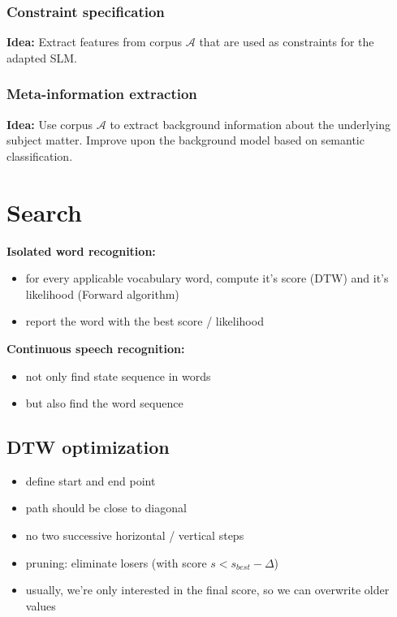 \documentclass[11pt]{article}
\begin{document}
\subsubsection{Constraint specification}
\textbf{Idea:} Extract features from corpus $\mathcal{A}$ that are used as constraints for the adapted SLM.
\subsubsection{Meta-information extraction}
\textbf{Idea:} Use corpus $\mathcal{A}$ to extract background information about the underlying subject matter. Improve upon the background model based on semantic classification.

\section{Search}

\textbf{Isolated word recognition:}
\begin{itemize}
    \item for every applicable vocabulary word, compute it's score (DTW) and it's likelihood (Forward algorithm)
    \item report the word with the best score / likelihood
\end{itemize}

\vspace{5pt}

\textbf{Continuous speech recognition:}
\begin{itemize}
    \item not only find state sequence in words
    \item but also find the word sequence
\end{itemize}

\vspace{5pt}

\subsection{DTW optimization}
\begin{itemize}
    \item define start and end point
    \item path should be close to diagonal
    \item no two successive horizontal / vertical steps
    \item pruning: eliminate losers (with score $s < s_{best} - \Delta$)
    \item usually, we're only interested in the final score, so we can overwrite older values
\end{itemize}
\end{document}
